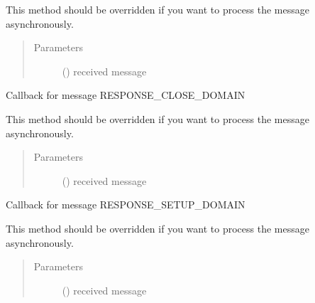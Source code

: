 \documentclass[letterpaper,10pt,english]{sphinxmanual}
\begin{document}
\begin{fulllineitems}
\begin{fulllineitems}
This method should be overridden if you want to process the message asynchronously.
\begin{quote}\begin{description}
\item[{Parameters}] \leavevmode
{} () \textendash{} received message

\end{description}\end{quote}

\end{fulllineitems}


\begin{fulllineitems}
\label{\detokenize{bbc1.core.bbc_app:bbc1.core.bbc_app.Callback.proc_resp_domain_close}}
Callback for message RESPONSE\_CLOSE\_DOMAIN

This method should be overridden if you want to process the message asynchronously.
\begin{quote}\begin{description}
\item[{Parameters}] \leavevmode
{} () \textendash{} received message

\end{description}\end{quote}

\end{fulllineitems}


\begin{fulllineitems}
\label{\detokenize{bbc1.core.bbc_app:bbc1.core.bbc_app.Callback.proc_resp_domain_setup}}
Callback for message RESPONSE\_SETUP\_DOMAIN

This method should be overridden if you want to process the message asynchronously.
\begin{quote}\begin{description}
\item[{Parameters}] \leavevmode
{} () \textendash{} received message


\end{description}
\end{quote}
\end{fulllineitems}
\end{fulllineitems}
\end{document}
